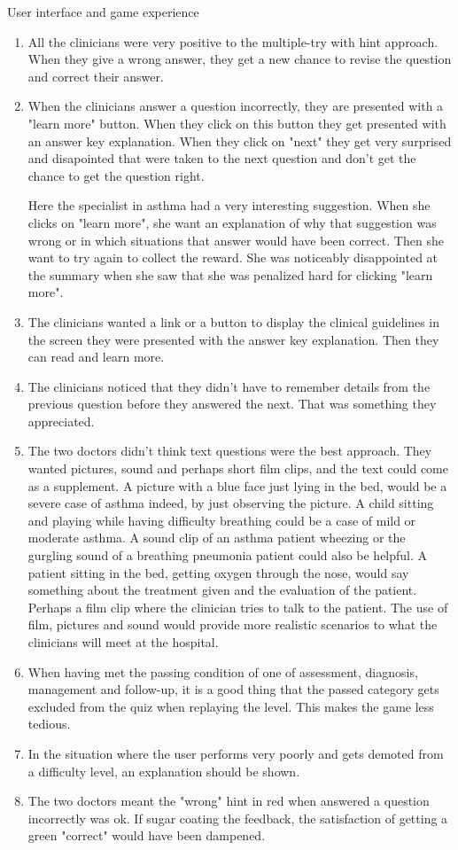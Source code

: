 User interface and game experience
 \begin{enumerate}
 	\item All the clinicians were very positive to the multiple-try with hint approach. When they give a wrong answer, they get a new chance to revise the question and correct their answer.
 	\item When the clinicians answer a question incorrectly, they are presented with a "learn more" button. When they click on this button they get presented with an answer key explanation. When they click on "next" they get very surprised and disapointed that were taken to the next question and don't get the chance to get the question right.
 	
 	Here the specialist in asthma had a very interesting suggestion. When she clicks on "learn more", she want an explanation of why that suggestion was wrong or in which situations that answer would have been correct. Then she want to try again to collect the reward. She was noticeably disappointed at the summary when she saw that she was penalized hard for clicking "learn more".
 	\item The clinicians wanted a link or a button to display the clinical guidelines in the screen they were presented with the answer key explanation. Then they can read and learn more.
 	\item The clinicians noticed that they didn't have to remember details from the previous question before they answered the next. That was something they appreciated.
 	\item The two doctors didn't think text questions were the best approach. They wanted pictures, sound and perhaps short film clips, and the text could come as a supplement. A picture with a blue face just lying in the bed, would be a severe case of asthma indeed, by just observing the picture. A child sitting and playing while having difficulty breathing could be a case of mild or moderate asthma. A sound clip of an asthma patient wheezing or the gurgling sound of a breathing pneumonia patient could also be helpful. A patient sitting in the bed, getting oxygen through the nose, would say something about the treatment given and the evaluation of the patient. Perhaps a film clip where the clinician tries to talk to the patient. The use of film, pictures and sound would provide more realistic scenarios to what the clinicians will meet at the hospital.
 	\item When having met the passing condition of one of assessment, diagnosis, management and follow-up, it is a good thing that the passed category gets excluded from the quiz when replaying the level. This makes the game less tedious.
 	\item In the situation where the user performs very poorly and gets demoted from a difficulty level, an explanation should be shown.
 	\item The two doctors meant the "wrong" hint in red when answered a question incorrectly was ok. If sugar coating the feedback, the satisfaction of getting a green "correct" would have been dampened.
\end{enumerate}

